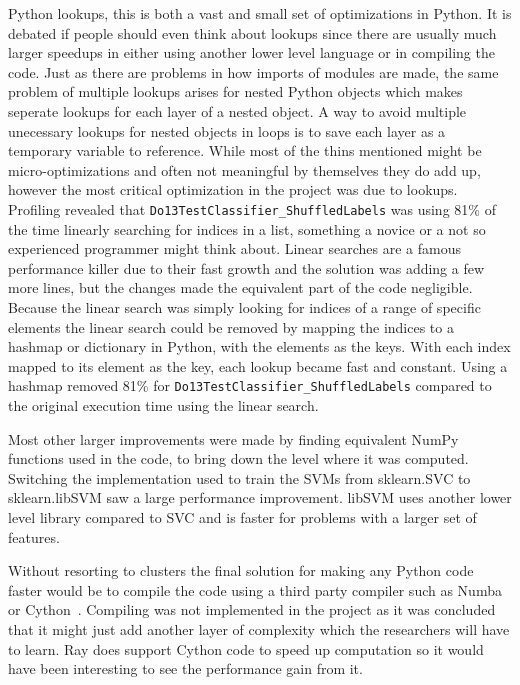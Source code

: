 \documentclass[12pt, a4paper]{article}
\begin{document}
Python lookups, this is both a vast and small set of optimizations in Python.
It is debated if people should even think about lookups since there are usually much larger speedups in either using another lower level language or in compiling the code.
Just as there are problems in how imports of modules are made, the same problem of multiple lookups arises for nested Python objects which makes seperate lookups for each layer of a nested object.
A way to avoid multiple unecessary lookups for nested objects in loops is to save each layer as a temporary variable to reference.
While most of the thins mentioned might be micro-optimizations and often not meaningful by themselves they do add up, however the most critical optimization in the project was due to lookups.
Profiling revealed that \texttt{Do13TestClassifier\_ShuffledLabels} was using 81\% of the time linearly searching for indices in a list, something a novice or a not so experienced programmer might think about.
Linear searches are a famous performance killer due to their fast growth and the solution was adding a few more lines, but the changes made the equivalent part of the code negligible.
Because the linear search was simply looking for indices of a range of specific elements the linear search could be removed by mapping the indices to a hashmap or dictionary in Python, with the elements as the keys.
With each index mapped to its element as the key, each lookup became fast and constant.
Using a hashmap removed 81\% for \texttt{Do13TestClassifier\_ShuffledLabels} compared to the original execution time using the linear search.

Most other larger improvements were made by finding equivalent NumPy functions used in the code, to bring down the level where it was computed.
Switching the implementation used to train the SVMs from sklearn.SVC to sklearn.libSVM saw a large performance improvement.
libSVM uses another lower level library compared to SVC and is faster for problems with a larger set of features.

Without resorting to clusters the final solution for making any Python code faster would be to compile the code using a third party compiler such as Numba or Cython~\cite{matEval}.
Compiling was not implemented in the project as it was concluded that it might just add another layer of complexity which the researchers will have to learn.
Ray does support Cython code to speed up computation so it would have been interesting to see the performance gain from it.
\end{document}
